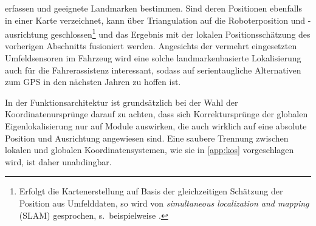 erfassen und geeignete Landmarken bestimmen. Sind deren Positionen ebenfalls in einer Karte verzeichnet, kann über Triangulation auf die Roboterposition und -ausrichtung geschlossen\footnote{Erfolgt die Kartenerstellung auf Basis der gleichzeitigen Schätzung der Position aus Umfelddaten, so wird von \emph{simultaneous localization and mapping } (SLAM) gesprochen, s.\ beispielweise \cite{Thrun2005, geiger2012we, kohlhepp2007elastic}.} und das Ergebnis mit der lokalen Positionsschätzung des vorherigen Abschnitts fusioniert werden. Angesichts der vermehrt eingesetzten Umfeldsensoren im Fahrzeug wird eine solche landmarkenbasierte Lokalisierung auch für die Fahrerassistenz interessant, sodass auf serientaugliche Alternativen zum GPS in den nächsten Jahren zu hoffen ist.

In der Funktionsarchitektur ist grundsätzlich bei der Wahl der Koordinatenursprünge darauf zu achten, dass sich Korrektursprünge der globalen Eigenlokalisierung nur auf Module auswirken, die auch wirklich auf eine absolute Position und Ausrichtung angewiesen sind. Eine saubere Trennung zwischen lokalen und globalen Koordinatensystemen, wie sie in \ref{app:kos} vorgeschlagen wird, ist daher unabdingbar.




